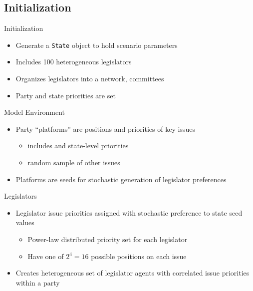 \documentclass[14pt]{beamer}
\begin{document}
\subsection*{Initialization} %
\begin{frame}{Initialization}
\begin{itemize}
\item Generate a \texttt{State} object to hold scenario parameters 
\item Includes 100 heterogeneous legislators
\item Organizes legislators into a network, committees
\item Party and state priorities are set
\end{itemize}
\end{frame}

\begin{frame}{Model Environment}%
\begin{itemize}
\item Party ``platforms'' are positions and priorities of key issues
 \begin{itemize}
 \item includes and state-level priorities
 \item random sample of other issues
 \end{itemize}
\item Platforms are seeds for stochastic generation of legislator preferences  
\end{itemize}
\end{frame}

\begin{frame}{Legislators} %
\begin{itemize}
\item Legislator issue priorities assigned with stochastic preference to state seed values
 \begin{itemize}
 \item Power-law distributed priority set for each legislator
 \item Have one of $2^4 = 16$ possible positions on each issue
 \end{itemize}
\item Creates heterogeneous set of legislator agents with correlated issue priorities within a party  
\end{itemize}
\end{frame}
\end{document}

